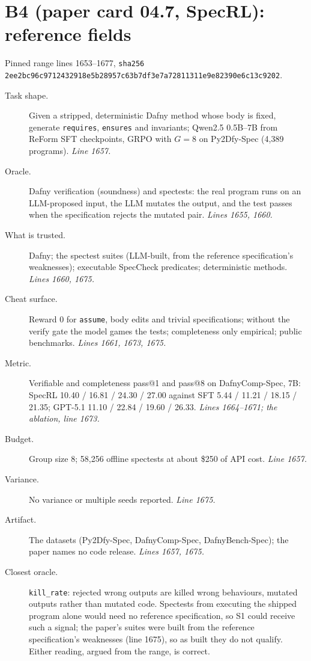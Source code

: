 \documentclass[11pt]{article}
\begin{document}
\section*{B4 (paper card 04.7, SpecRL): reference fields}
Pinned range lines 1653--1677,
\texttt{sha256 2ee2bc96c9712432918e5b28957c63b7df3e7a72811311e9e82390e6c13c9202}.
\begin{description}
\item[Task shape.] Given a stripped, deterministic Dafny method whose body is
  fixed, generate \texttt{requires}, \texttt{ensures} and invariants; Qwen2.5
  0.5B--7B from ReForm SFT checkpoints, GRPO with $G = 8$ on Py2Dfy-Spec
  (4,389 programs). \emph{Line 1657.}
\item[Oracle.] Dafny verification (soundness) and spectests: the real program
  runs on an LLM-proposed input, the LLM mutates the output, and the test
  passes when the specification rejects the mutated pair. \emph{Lines 1655,
  1660.}
\item[What is trusted.] Dafny; the spectest suites (LLM-built, from the
  reference specification's weaknesses); executable SpecCheck predicates;
  deterministic methods. \emph{Lines 1660, 1675.}
\item[Cheat surface.] Reward 0 for \texttt{assume}, body edits and trivial
  specifications; without the verify gate the model games the tests;
  completeness only empirical; public benchmarks. \emph{Lines 1661, 1673,
  1675.}
\item[Metric.] Verifiable and completeness pass@1 and pass@8 on
  DafnyComp-Spec, 7B: SpecRL 10.40 / 16.81 / 24.30 / 27.00 against SFT 5.44 /
  11.21 / 18.15 / 21.35; GPT-5.1 11.10 / 22.84 / 19.60 / 26.33. \emph{Lines
  1664--1671; the ablation, line 1673.}
\item[Budget.] Group size 8; 58,256 offline spectests at about \$250 of API
  cost. \emph{Line 1657.}
\item[Variance.] No variance or multiple seeds reported. \emph{Line 1675.}
\item[Artifact.] The datasets (Py2Dfy-Spec, DafnyComp-Spec, DafnyBench-Spec);
  the paper names no code release. \emph{Lines 1657, 1675.}
\item[Closest oracle.] \texttt{kill\_rate}: rejected wrong outputs are killed
  wrong behaviours, mutated outputs rather than mutated code. Spectests from
  executing the shipped program alone would need no reference specification,
  so S1 could receive such a signal; the paper's suites were built from the
  reference specification's weaknesses (line 1675), so as built they do not
  qualify. Either reading, argued from the range, is correct.
\end{description}
\end{document}
